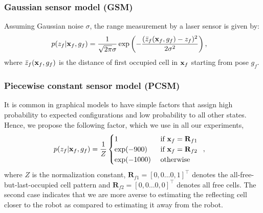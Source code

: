 \documentclass[letterpaper, 10 pt, conference]{ieeeconf} %
\newcommand{\vect}[1]{\mathbf{#1}}
\begin{document}
\subsubsection{Gaussian sensor model (GSM)}
\newcommand{\actz}{\bar{z}_f(\map_f, g_f)}
Assuming Gaussian noise $\sigma$, the range measurement by a laser sensor is given by:
\begin{align}
  p(z_f|\map_f, g_f) &=
  \frac{1}{\sqrt{2\pi}\sigma}\exp\left(-\frac{(\actz - z_f)^2}{2\sigma^2}\right)
  ,
  \label{eq:gaussiansensormodel}
\end{align}
where $\actz$ is the distance of first occupied cell in $\map_f$ starting
from pose $g_f$. 


\subsubsection{Piecewise constant sensor model (PCSM)}
It is common in graphical models to have simple factors that assign high
probability to expected configurations and low probability to all other
states. 
%
Hence, we propose
the following factor, which we use in all our experiments,
\begin{align}
  p(z_f|\map_f, g_f) &= \frac{1}{Z}\begin{cases}
                       1 & \text{ if } \map_f = \vect{R}_{f1}\\
              \exp(-900) & \text{ if } \map_f = \vect{R}_{f2}\\
           \exp(-1000) & \text{ otherwise}
  \end{cases}
  \enspace,
  \label{eq:piecewiseconstant}
\end{align}
where $Z$ is the normalization constant, $\vect{R}_{f1} = [0, 0 \dots 0,
1]^\top$ denotes the all-free-but-last-occupied cell pattern and $\vect{R}_{f2} =
[0, 0 \dots 0, 0]^\top$ denotes all free cells. The second case indicates that
we are more averse to estimating the reflecting cell closer to the robot as
compared to estimating it away from the robot.
\end{document}
